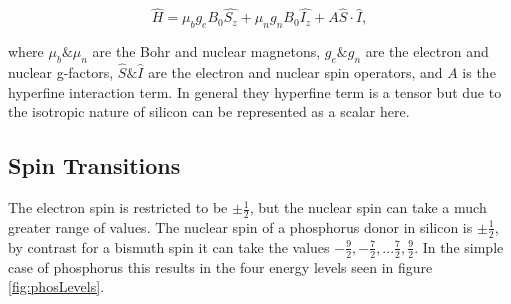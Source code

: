 \begin{equation}
\label{eq:spinHam}
\hat{H} = \mu_bg_eB_0\hat{S_z} + \mu_ng_nB_0\hat{I_z} + A \hat{S}\cdot\hat{I},
\end{equation}

where $\mu_b \text{\&} \mu_n$ are the Bohr and nuclear magnetons, $g_e \text{\&} g_n$ are the electron and nuclear g-factors, $\hat{S} \text{\&} \hat{I}$ are the electron and nuclear spin operators, and $A$ is the hyperfine interaction term.
In general they hyperfine term is a tensor but due to the isotropic nature of silicon can be represented as a scalar here.

\subsection{Spin Transitions}

The electron spin is restricted to be $\pm \frac{1}{2}$, but the nuclear spin can take a much greater range of values. 
The nuclear spin of a phosphorus donor in silicon is $\pm \frac{1}{2}$, by contrast for a bismuth spin it can take the values $-\frac{9}{2}, -\frac{7}{2},...\frac{7}{2},\frac{9}{2}$. 
In the simple case of phosphorus this results in the four energy levels seen in figure \ref{fig:phosLevels}.

